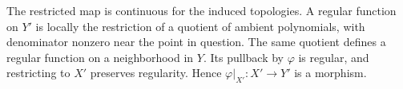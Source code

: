 The restricted map is continuous for the induced topologies. A regular function on $Y'$ is locally the restriction of a quotient of ambient polynomials, with denominator nonzero near the point in question. The same quotient defines a regular function on a neighborhood in $Y$. Its pullback by $\varphi$ is regular, and restricting to $X'$ preserves regularity. Hence $\varphi|_{X'}:X'\to Y'$ is a morphism.
